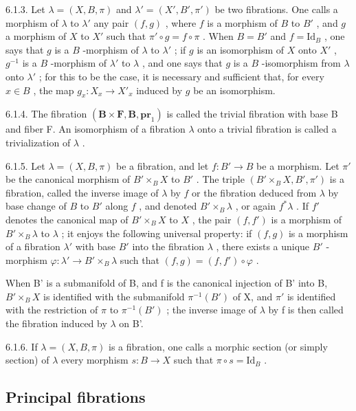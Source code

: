 6.1.3. Let \(\lambda = (X, B, \pi)\) and \(\lambda' = (X', B', \pi')\) be two fibrations. One calls a morphism of \(\lambda\) to \(\lambda'\) any pair \((f, g)\) , where \(f\) is a morphism of \(B\) to \(B'\) , and \(g\) a morphism of \(X\) to \(X'\) such that \(\pi' \circ g = f \circ \pi\) . When \(B = B'\) and \(f = \mathrm{Id}_B\) , one says that \(g\) is a \(B\) -morphism of \(\lambda\) to \(\lambda'\) ; if \(g\) is an isomorphism of \(X\) onto \(X'\) , \(g^{-1}\) is a \(B\) -morphism of \(\lambda'\) to \(\lambda\) , and one says that \(g\) is a \(B\) -isomorphism from \(\lambda\) onto \(\lambda'\) ; for this to be the case, it is necessary and sufficient that, for every \(x \in B\) , the map \(g_x: X_x \to X'_x\) induced by \(g\) be an isomorphism.

6.1.4. The fibration \((\mathbf{B} \times \mathbf{F}, \mathbf{B}, \mathbf{pr}_{1})\) is called the trivial fibration with base B and fiber F. An isomorphism of a fibration \(\lambda\) onto a trivial fibration is called a trivialization of \(\lambda\) .

6.1.5. Let \(\lambda = (X, B, \pi)\) be a fibration, and let \(f: B' \to B\) be a morphism. Let \(\pi'\) be the canonical morphism of \(B' \times_B X\) to \(B'\) . The triple \((B' \times_B X, B', \pi')\) is a fibration, called the inverse image of \(\lambda\) by \(f\) or the fibration deduced from \(\lambda\) by base change of \(B\) to \(B'\) along \(f\) , and denoted \(B' \times_B \lambda\) , or again \(f^*\lambda\) . If \(f'\) denotes the canonical map of \(B' \times_B X\) to \(X\) , the pair \((f, f')\) is a morphism of \(B' \times_B \lambda\) to \(\lambda\) ; it enjoys the following universal property: if \((f, g)\) is a morphism of a fibration \(\lambda'\) with base \(B'\) into the fibration \(\lambda\) , there exists a unique \(B'\) -morphism \(\varphi: \lambda' \to B' \times_B \lambda\) such that \((f, g) = (f, f') \circ \varphi\) .

When B' is a submanifold of B, and f is the canonical injection of B' into B, \(B' \times_{B} X\) is identified with the submanifold \(\pi^{-1}(B')\) of X, and \(\pi'\) is identified with the restriction of \(\pi\) to \(\pi^{-1}(B')\) ; the inverse image of \(\lambda\) by f is then called the fibration induced by \(\lambda\) on B'.

6.1.6. If \(\lambda = (X, B, \pi)\) is a fibration, one calls a morphic section (or simply section) of \(\lambda\) every morphism \(s: B \to X\) such that \(\pi \circ s = \mathrm{Id}_B\) .

\subsection{Principal fibrations}

